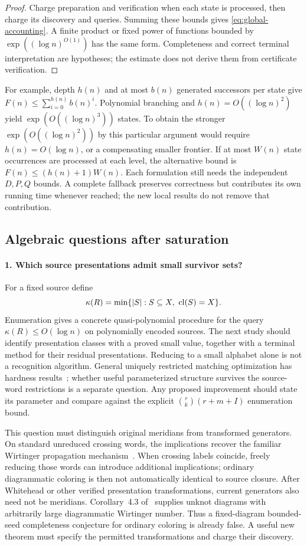 \begin{proof}
Charge preparation and verification when each state is processed, then
charge its discovery and queries. Summing these bounds gives
\eqref{eq:global-accounting}. A finite product or fixed power of functions
bounded by $\exp((\log n)^{O(1)})$ has the same form. Completeness and
correct terminal interpretation are hypotheses; the estimate does not
derive them from certificate verification.
\end{proof}

For example, depth $h(n)$ and at most $b(n)$ generated successors per
state give $F(n)\le\sum_{i=0}^{h(n)}b(n)^i$. Polynomial branching and
$h(n)=O((\log n)^2)$ yield $\exp(O((\log n)^3))$ states. To obtain the
stronger $\exp(O((\log n)^2))$ by this particular argument would require
$h(n)=O(\log n)$, or a compensating smaller frontier. If at most $W(n)$
state occurrences are processed at each level, the alternative bound is
$F(n)\le(h(n)+1)W(n)$. Each formulation still needs the independent
$D,P,Q$ bounds. A complete fallback preserves correctness but contributes
its own running time whenever reached; the new local results do not
remove that contribution.

\subsection{Algebraic questions after saturation}

\paragraph{1. Which source presentations admit small survivor sets?}
For a fixed source define
\[
 \kappa(R)=\min\{|S|:S\subseteq X,\ \cl(S)=X\}.
\]
Enumeration gives a concrete quasi-polynomial procedure for the query
$\kappa(R)\le O(\log n)$ on polynomially encoded sources. The next study
should identify presentation classes with a proved small value, together
with a terminal method for their residual presentations. Reducing to a
small alphabet alone is not a recognition algorithm. General uniquely
restricted matching optimization has hardness results~\cite{golumbic};
whether useful parameterized structure survives the source-word
restrictions is a separate question. Any proposed improvement should
state its parameter and compare against the explicit
$\binom rk(r+m+I)$ enumeration bound.

This question must distinguish original meridians from transformed
generators. On standard unreduced crossing words, the implications recover
the familiar Wirtinger propagation mechanism~\cite{wirtinger}. When
crossing labels coincide, freely reducing those words can introduce
additional implications; ordinary diagrammatic coloring is then not
automatically identical to source closure. After Whitehead or other
verified presentation transformations, current generators also need not
be meridians. Corollary~4.3 of~\cite{incompatibility} supplies unknot
diagrams with arbitrarily large diagrammatic Wirtinger number. Thus a
fixed-diagram bounded-seed completeness conjecture for ordinary coloring
is already false. A useful new theorem must specify the permitted
transformations and charge their discovery.

